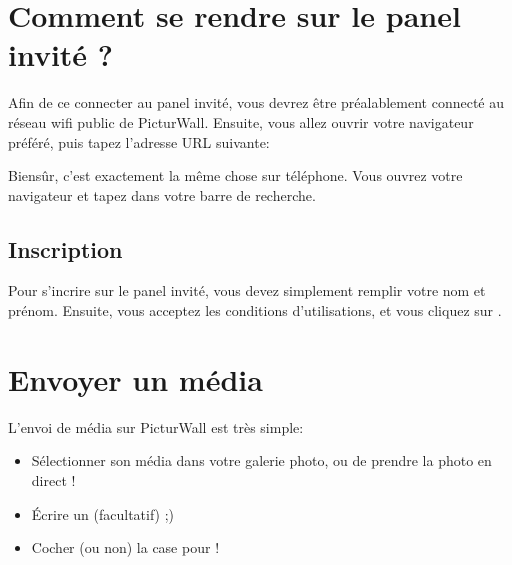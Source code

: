 \documentclass[letterpaper,10pt,french]{sphinxmanual}
\begin{document}
\chapter{Comment se rendre sur le panel invité ?}
\label{\detokenize{panel_invite/index:comment-se-rendre-sur-le-panel-invite}}
\sphinxAtStartPar
Afin de ce connecter au panel invité, vous devrez être préalablement connecté au réseau wifi public de PicturWall.
Ensuite, vous allez ouvrir votre navigateur préféré, puis tapez l’adresse URL suivante: 

\sphinxAtStartPar
Bien\sphinxhyphen{}sûr, c’est exactement la même chose sur téléphone.
Vous ouvrez votre navigateur et tapez  dans votre barre de recherche.


\section{Inscription}
\label{\detokenize{panel_invite/index:inscription}}
\sphinxAtStartPar
Pour s’incrire sur le panel invité, vous devez simplement remplir votre nom et prénom.
Ensuite, vous acceptez les conditions d’utilisations, et vous cliquez sur .

\begin{figure}[htbp]
\centering

\noindent{}
\end{figure}


\chapter{Envoyer un média}
\label{\detokenize{panel_invite/index:envoyer-un-media}}\label{\detokenize{panel_invite/index:invite-media}}
\sphinxAtStartPar
L’envoi de média sur PicturWall est très simple:
\begin{itemize}
\item {} 
\sphinxAtStartPar
Sélectionner son média dans votre galerie photo, ou de prendre la photo en direct !

\item {} 
\sphinxAtStartPar
Écrire un {\hyperref[\detokenize{panel_invite/index:invite-media-commentaire}]{}} (facultatif) ;)

\item {} 
\sphinxAtStartPar
Cocher (ou non) la case pour {\hyperref[\detokenize{panel_invite/index:invite-media-imprimer}]{}} !

\end{itemize}
\end{document}
